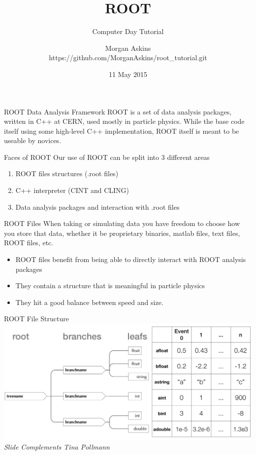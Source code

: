 \documentclass[xcolor=svgnames]{beamer}
\title{ROOT}
\subtitle{Computer Day Tutorial}
\author{Morgan Askins\\ https://github.com/MorganAskins/root\_tutorial.git}
\date{11 May 2015}
\begin{document}
{
\begin{frame}[noframenumbering]
  \titlepage
\end{frame}
}


\begin{frame}{ROOT Data Analysis Framework}
  ROOT is a set of data analysis packages, written in C++ at CERN, used mostly in particle
  physics. While the base code itself using some high-level C++ implementation, ROOT itself
  is meant to be useable by novices.
\end{frame}

\begin{frame}{Faces of ROOT}
  Our use of ROOT can be split into 3 different areas
  \begin{enumerate}
  \item ROOT files structures (.root files)
  \item C++ interpreter (CINT and CLING)
  \item Data analysis packages and interaction with .root files
  \end{enumerate}
\end{frame}

\begin{frame}{ROOT Files}
  When taking or simulating data you have freedom to choose how you store that data, whether
  it be proprietary binaries, matlab files, text files, ROOT files, etc.
  \begin{itemize}
  \item ROOT files benefit from being able to directly interact with ROOT analysis packages
  \item They contain a structure that is meaningful in particle physics
  \item They hit a good balance between speed and size.
  \end{itemize}
\end{frame}

\begin{frame}{ROOT File Structure}
  \includegraphics[width=\textwidth]{images/root_structure.png}\\
  \textit{\small Slide Complements Tina Pollmann}
\end{frame}
\end{document}
